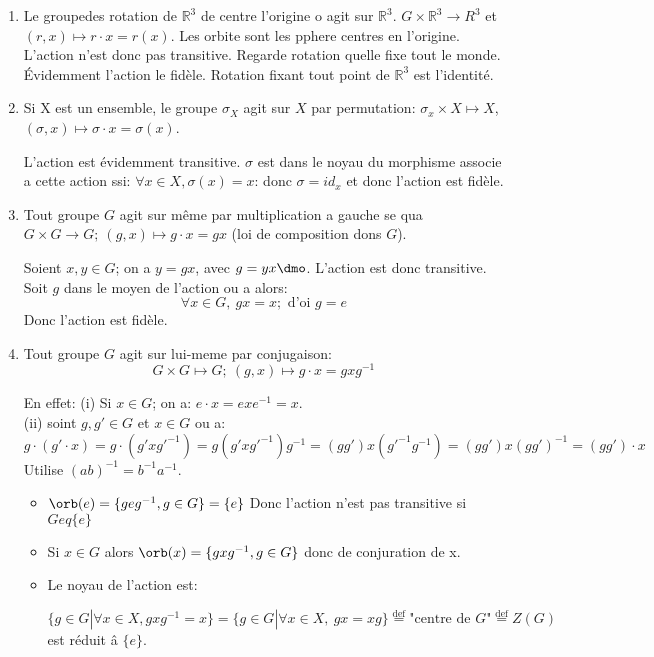 \begin{examplebox}
\begin{enumerate}
	\item Le groupedes rotation de $\mathbb{R}^3$ de centre l'origine o agit sur $\mathbb{R}^3$. $G\times\mathbb{R}^3\rightarrow{R}^3$ et $(r, x)\mapsto r\cdot x=r(x).$
	Les orbite sont les pphere centres en l'origine. L'action n'est donc pas transitive. Regarde rotation quelle fixe tout le monde. Évidemment l'action le fidèle. Rotation fixant tout point de $\mathbb{R}^3$ est l'identité.
	\item Si X est un ensemble, le groupe $\sigma_X$ agit sur $X$ par permutation:
	$\sigma_x \times X\mapsto X$, $(\sigma, x)\mapsto \sigma\cdot x=\sigma(x)$.
	
	L'action est évidemment transitive. $\sigma$ est dans le noyau du morphisme associe a cette action ssi: $\forall x\in X, \sigma(x)=x$: donc $\sigma =id_x$ et donc l'action est fidèle.
	\item Tout groupe $G$ agit sur même par multiplication a gauche se qua $G\times G \rightarrow G;\ (g,x)\mapsto g\cdot x=gx$ (loi de composition dons $G$).
	
	Soient $x, y\in G$; on a $y=gx$, avec $g=yx\dmo$. L'action est donc transitive.
	Soit $g$ dans le moyen de l'action ou a alors:
	$$\forall x\in G,\ gx=x; \mbox{ d'oi } g=e$$
	Donc l'action est fidèle.
	\item Tout groupe $G$ agit sur lui-meme par conjugaison:
	$$G\times G\mapsto G;\ (g,x)\mapsto g\cdot x=gxg^{-1}$$
	
	En effet: (i) Si $x\in G$; on a: $e\cdot x = exe^{-1} = x$.\\
	(ii)  soint $g, g'\in G$ et $x\in G$ ou a:
	$$g\cdot (g'\cdot x)=g\cdot (g'xg'^{-1})=g(g'xg'^{-1})g^{-1}=(gg')x(g'^{-1}g^{-1})=(gg')x(gg')^{-1}=(gg')\cdot x$$
	Utilise $(ab)^{-1}=b^{-1}a^{-1}$.
	\begin{itemize} 
	\item $\orb(e)=\{geg^{-1}, g\in G\}=\{e\}$ Donc l'action n'est pas transitive si $G eq\{e\}$ \\%
	\item Si $x\in G$ alors $\orb(x)=\{gxg^{-1}, g\in G\}$ donc de conjuration de x.\\
	\item Le noyau de l'action est:	

	$$\{g\in G | \forall x\in X, gxg^{-1} = x\} = \{g\in G | \forall x \in X,\ gx=xg\}\overset{\text{def}}{=}\text{"centre de $G$"}\overset{\text{def}}{=} Z(G)$$
	est réduit â $\{e\}$.
	\end{itemize}
\end{enumerate}
\end{examplebox}

